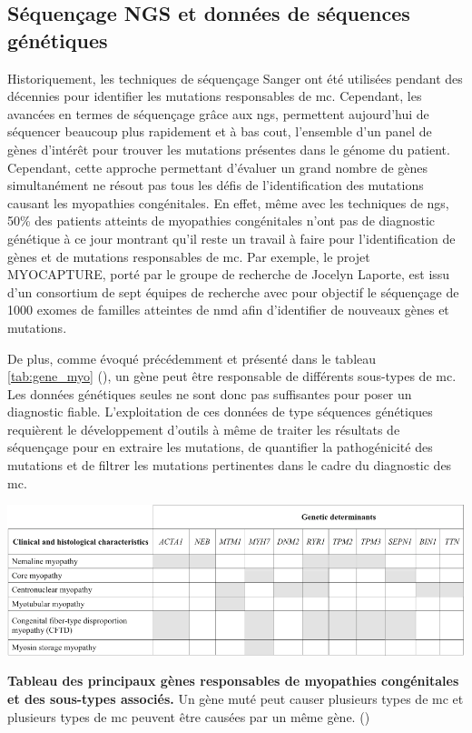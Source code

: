 \subsection{Séquençage NGS et données de séquences génétiques}
Historiquement, les techniques de séquençage Sanger ont été utilisées pendant des décennies pour identifier les mutations responsables de \gls{mc}. Cependant, les avancées en termes de séquençage grâce aux \gls{ngs}, permettent aujourd'hui de séquencer beaucoup plus rapidement et à bas cout, l'ensemble d'un panel de gènes d'intérêt pour trouver les mutations présentes dans le génome du patient. Cependant, cette approche permettant d'évaluer un grand nombre de gènes simultanément ne résout pas tous les défis de l'identification des mutations causant les myopathies congénitales. En effet, même avec les techniques de \gls{ngs}, 50\% des patients atteints de myopathies congénitales n'ont pas de diagnostic génétique à ce jour montrant qu'il reste un travail à faire pour l'identification de gènes et de mutations responsables de \gls{mc}. Par exemple, le projet MYOCAPTURE, porté par le groupe de recherche de Jocelyn Laporte, est issu d'un consortium de sept équipes de recherche avec pour objectif le séquençage de 1000 exomes de familles atteintes de \gls{nmd} afin d'identifier de nouveaux gènes et mutations.

De plus, comme évoqué précédemment et présenté dans le tableau \ref{tab:gene_myo} (\cite{cassandrini_congenital_2017}), un gène peut être responsable de différents sous-types de \gls{mc}. Les données génétiques seules ne sont donc pas suffisantes pour poser un diagnostic fiable. L'exploitation de ces données de type séquences génétiques requièrent le développement d'outils à même de traiter les résultats de séquençage pour en extraire les mutations, de quantifier la pathogénicité des mutations et de filtrer les mutations pertinentes dans le cadre du diagnostic des \gls{mc}. 

\begin{table}[htbp]
\centering
\includegraphics[width=1\textwidth]{figures/gene_tab.png}
\caption[Tableau des principaux gènes responsables de myopathies congénitales et des sous-types associés]{\textbf{Tableau des principaux gènes responsables de myopathies congénitales et des sous-types associés.} Un gène muté peut causer plusieurs types de \gls{mc} et plusieurs types de \gls{mc} peuvent être causées par un même gène. (\cite{cassandrini_congenital_2017})} 
\label{tab:gene_myo}
\end{table}


